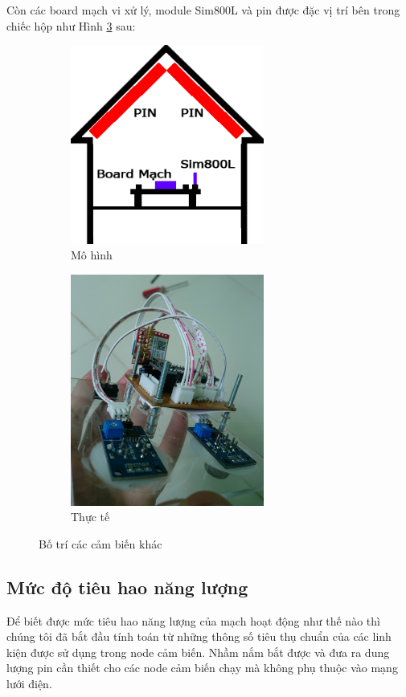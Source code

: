 Còn các board mạch vi xử lý, module Sim800L và pin được đặc vị trí bên trong chiếc hộp như Hình \ref{fig:botrikhac} sau:
\begin{figure}[H]
\centering  
  \begin{subfigure}[b]{0.5\textwidth}
    \includegraphics[width=2.5in]{house_board_kogps}
    \caption[Mô hình]{Mô hình}
    \label{fig:house_board_kogps}
  \end{subfigure}\hfill
  \begin{subfigure}[b]{0.5\textwidth}
    \includegraphics[width=2.5in]{pic1}
  	 \caption[Thực tế]{Thực tế}
    \label{fig:pic1}
  \end{subfigure}
  \caption{Bố trí các cảm biến khác}\label{fig:botrikhac}
\end{figure}
\subsection{Mức độ tiêu hao năng lượng}
Để biết được mức tiêu hao năng lượng của mạch hoạt động như thế nào thì chúng tôi đã bắt đầu tính toán từ những thông số tiêu thụ chuẩn của các linh kiện được sử dụng trong node cảm biến. Nhầm nắm bắt được và đưa ra dung lượng pin cần thiết cho các node cảm biến chạy mà không phụ thuộc vào mạng lưới điện.

